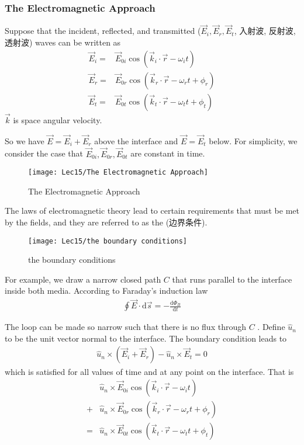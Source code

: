 \subsubsection{The Electromagnetic Approach}
Suppose that the incident, reflected, and transmitted ($\vec{E}_i, \vec{E}_r, \vec{E}_t$, 入射波, 反射波, 透射波) waves can be written as
\begin{align*}
    \vec{E}_i=&\vec{E}_{0i}\cos\left( \vec{k}_i\cdot\vec{r}-\omega_i t \right)\\
    \vec{E}_r=&\vec{E}_{0r}\cos\left( \vec{k}_r\cdot\vec{r}-\omega_r t +\phi_r\right)\\
    \vec{E}_t=&\vec{E}_{0t}\cos\left( \vec{k}_t\cdot\vec{r}-\omega_t t +\phi_t\right)
\end{align*}
$\vec{k}$ is space angular velocity. 

So we have $\vec{E}=\vec{E}_i+\vec{E}_r$ above the interface and $\vec{E}=\vec{E}_t$ below. For simplicity, we consider the case that $\vec{E}_{0i}, \vec{E}_{0r}, \vec{E}_{0t}$ are constant in time. 

\begin{figure}[H]
    \centering
    \texttt{[image: Lec15/The Electromagnetic Approach]}
    \caption{The Electromagnetic Approach}
\end{figure}

The laws of electromagnetic theory lead to certain requirements that must be met by the fields, and they are referred to as the  (边界条件). 

\begin{figure}[H]
    \centering
    \texttt{[image: Lec15/the boundary conditions]}
    \caption{the boundary conditions}
\end{figure}

For example, we draw a narrow closed path $C$ that runs parallel to the interface inside both media. According to Faraday's induction law 
\begin{align*}
    \oint \vec{E}\cdot \mathrm{d} \vec{s}=-\frac{\mathrm{d }\Phi_B }{\mathrm{d}t}
\end{align*}

The loop can be made so narrow such that there is no flux
through $C$ . Define $\hat{u}_n$ to be the unit vector normal to the interface. The boundary condition leads to
\begin{align*}
    \hat{u}_n \times (\vec{E}_i+\vec{E}_r)-\hat{u}_n \times \vec{E}_t=0
\end{align*}
which is satisfied for all values of time and at any point on the interface. That is 
\begin{align*}
    &\hat{u}_n \times \vec{E}_{0i}\cos\left( \vec{k}_i\cdot\vec{r}-\omega_i t \right)\\
    +& \hat{u}_n \times \vec{E}_{0r}\cos\left( \vec{k}_r\cdot\vec{r}-\omega_r t +\phi_r\right) \\
    =& \hat{u}_n \times \vec{E}_{0t}\cos\left( \vec{k}_t\cdot\vec{r}-\omega_t t +\phi_t\right)
\end{align*}

